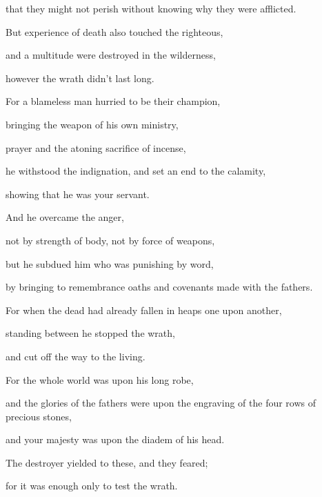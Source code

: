 {\par }{\QB that they might not perish without knowing why they were afflicted.
\par }{\BB \par }{\Q {}But experience of death also touched the righteous,
\par }{\QB and a multitude were destroyed in the wilderness,
\par }{\QB however the wrath didn’t last long.
\par }{\Q {}For a blameless man hurried to be their champion,
\par }{\QB bringing the weapon of his own ministry,
\par }{\QB prayer and the atoning sacrifice of incense,
\par }{\QB he withstood the indignation, and set an end to the calamity,
\par }{\QB showing that he was your servant.
\par }{\Q {}And he overcame the anger,
\par }{\QB not by strength of body, not by force of weapons,
\par }{\QB but he subdued him who was punishing by word,
\par }{\QB by bringing to remembrance oaths and covenants made with the fathers.
\par }{\Q {}For when the dead had already fallen in heaps one upon another,
\par }{\QB standing between he stopped the wrath,
\par }{\QB and cut off the way to the living.
\par }{\Q {}For the whole world was upon his long robe,
\par }{\QB and the glories of the fathers were upon the engraving of the four rows of precious stones,
\par }{\QB and your majesty was upon the diadem of his head.
\par }{\Q {}The destroyer yielded to these, and they feared;
\par }{\QB for it was enough only to test the wrath.
\par }{\BB \par }
